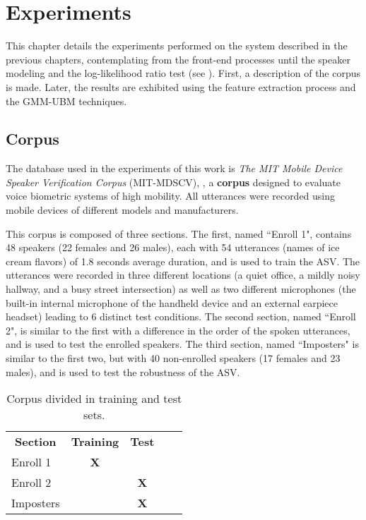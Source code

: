 \chapter{Experiments}
\label{ch:experiments}

This chapter details the experiments performed on the system described in the previous chapters, contemplating from the front-end processes until the speaker modeling and the log-likelihood ratio test (see ). First, a description of the corpus is made. Later, the results are exhibited using the feature extraction process and the GMM-UBM techniques.

\section{Corpus}
\label{sec:corpus}

The database used in the experiments of this work is \emph{The MIT Mobile Device Speaker Verification Corpus} (MIT-MDSCV), , a \textbf{corpus} designed to evaluate voice biometric systems of high mobility. All utterances were recorded using mobile devices of different models and manufacturers.

This corpus is composed of three sections. The first, named ``Enroll 1", contains 48 speakers (22 females and 26 males), each with 54 utterances (names of ice cream flavors) of 1.8 seconds average duration, and is used to train the ASV. The utterances were recorded in three different locations (a quiet office, a mildly noisy hallway, and a busy street intersection) as well as two different microphones (the built-in internal microphone of the handheld device and an external earpiece headset) leading to 6 distinct test conditions. The second section, named ``Enroll 2", is similar to the first with a difference in the order of the spoken utterances, and is used to test the enrolled speakers. The third section, named ``Imposters" is similar to the first two, but with 40 non-enrolled speakers (17 females and 23 males), and is used to test the robustness of the ASV.

\begin{table}[h]
    \centering
    \begin{tabular}{|l|c|c|ll}
        \cline{1-3}
        \multicolumn{1}{|c|}{\textbf{Section}} & \textbf{Training} & \textbf{Test} &  &  \\ \cline{1-3}
        Enroll 1 & \textbf{X} & \textbf{} &  &  \\ \cline{1-3}
        Enroll 2 & \textbf{} & \textbf{X} &  &  \\ \cline{1-3}
        Imposters & \textbf{} & \textbf{X} &  &  \\ \cline{1-3}
    \end{tabular}
    \caption{Corpus divided in training and test sets.}
    \label{tab:corpus-division}
\end{table}

